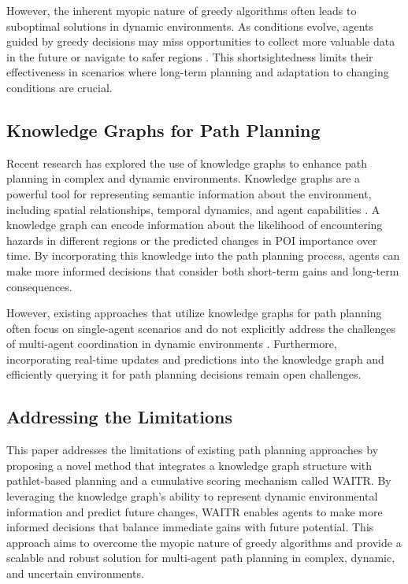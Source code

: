 \documentclass[conference]{IEEEtran}
\begin{document}
However, the inherent myopic nature of greedy algorithms often leads to suboptimal solutions in dynamic environments. As conditions evolve, agents guided by greedy decisions may miss opportunities to collect more valuable data in the future or navigate to safer regions \cite{xu2020greedy_dynamic, mei2024multi_agent}. This shortsightedness limits their effectiveness in scenarios where long-term planning and adaptation to changing conditions are crucial.

\subsection{Knowledge Graphs for Path Planning}

Recent research has explored the use of knowledge graphs to enhance path planning in complex and dynamic environments. Knowledge graphs are a powerful tool for representing semantic information about the environment, including spatial relationships, temporal dynamics, and agent capabilities \cite{chen2020knowledge}.  A knowledge graph can encode information about the likelihood of encountering hazards in different regions or the predicted changes in POI importance over time. By incorporating this knowledge into the path planning process, agents can make more informed decisions that consider both short-term gains and long-term consequences.

However, existing approaches that utilize knowledge graphs for path planning often focus on single-agent scenarios and do not explicitly address the challenges of multi-agent coordination in dynamic environments \cite{khan2018knowledge}. Furthermore, incorporating real-time updates and predictions into the knowledge graph and efficiently querying it for path planning decisions remain open challenges.

\subsection{Addressing the Limitations}

This paper addresses the limitations of existing path planning approaches by proposing a novel method that integrates a knowledge graph structure with pathlet-based planning and a cumulative scoring mechanism called WAITR. By leveraging the knowledge graph's ability to represent dynamic environmental information and predict future changes, WAITR enables agents to make more informed decisions that balance immediate gains with future potential. This approach aims to overcome the myopic nature of greedy algorithms and provide a scalable and robust solution for multi-agent path planning in complex, dynamic, and uncertain environments.
\end{document}
